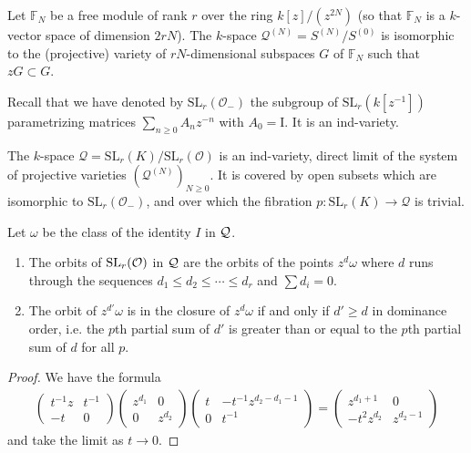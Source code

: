 \documentclass[12pt]{article}
\begin{document}
\vspace{10pt}

\begin{corollary}
    Let $\mathbb{F}_N$ be a free module of rank $r$ over the ring $k[z]/(z^{2N})$ (so that $\mathbb{F}_N$ is a $k$-vector space of dimension $2rN$). The $k$-space $\mathcal{Q}^{(N)} = S^{(N)}/S^{(0)}$ is isomorphic to the (projective) variety of $rN$-dimensional subspaces $G$ of $\mathbb{F}_N$ such that $zG \subset G$.
\end{corollary}
Recall that we have denoted by $\mathrm{SL}_r(\mathcal{O}_-)$ the subgroup of $\mathrm{SL}_r(k[z^{-1}])$ parametrizing matrices $\sum_{n \geq 0} A_n z^{-n}$ with $A_0 = \mathrm{I}$. It is an ind-variety.

\begin{theorem}
    The $k$-space $\mathcal{Q} = \mathrm{SL}_r(K)/\mathrm{SL}_r(\mathcal{O})$ is an ind-variety, direct limit of the system of projective varieties $(\mathcal{Q}^{(N)})_{N \geq 0}$. It is covered by open subsets which are isomorphic to $\mathrm{SL}_r(\mathcal{O}_-)$, and over which the fibration $p : \mathrm{SL}_r(K) \longrightarrow \mathcal{Q}$ is trivial.
\end{theorem}

\begin{proposition}
    Let $\omega$ be the class of the identity $I$ in ${\mathcal{Q}}$.
    \begin{enumerate}
        \item The orbits of $\operatorname{SL}_r(\mathcal{O})$ in ${\mathcal{Q}}$ are the orbits of the points $z^d\omega$ where $d$ runs through the sequences $d_1 \leq d_2 \leq \cdots \leq d_r$ and $\sum d_i = 0$.
        \item The orbit of $z^{d'}\omega$ is in the closure of $z^{d}\omega$ if and only if $d' \geq d$ in dominance order, i.e. the $p$th partial sum of $d'$ is greater than or equal to the $p$th partial sum of $d$ for all $p$.
    \end{enumerate}
\end{proposition}
\begin{proof}
    We have the formula \begin{align*}
        \begin{pmatrix}
            t^{-1}z & t^{-1} \\
            -t      & 0
        \end{pmatrix}\begin{pmatrix}
                         z^{d_1} & 0       \\
                         0       & z^{d_2}
                     \end{pmatrix}
        \begin{pmatrix}
            t & -t^{-1}z^{d_2 - d_1 - 1} \\
            0 & t^{-1}
        \end{pmatrix} = \begin{pmatrix}
                            z^{d_1+1}   & 0         \\
                            -t^2z^{d_2} & z^{d_2-1}
                        \end{pmatrix}
    \end{align*} and take the limit as $t \to 0$.
\end{proof}
\end{document}
